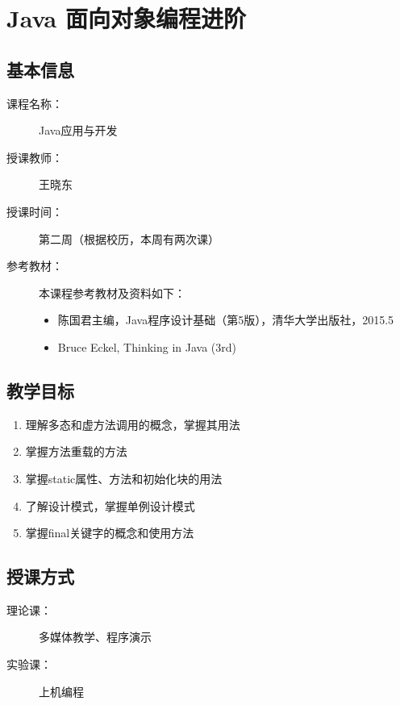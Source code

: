 \chapter{Java 面向对象编程进阶}
\label{chp:Advanced-object-oriented-programming-2}

\section*{基本信息}
\sline
\begin{description}
\item[课程名称：] Java应用与开发
\item[授课教师：] 王晓东
\item[授课时间：] 第二周（根据校历，本周有两次课）
\item[参考教材：] 本课程参考教材及资料如下：
  \begin{itemize}
  \item 陈国君主编，Java程序设计基础（第5版），清华大学出版社，2015.5
  \item Bruce Eckel, Thinking in Java (3rd)
  \end{itemize}
\end{description}

\section*{教学目标}

\sline

\begin{enumerate}
\item 理解多态和虚方法调用的概念，掌握其用法
\item 掌握方法重载的方法
\item 掌握static属性、方法和初始化块的用法
\item 了解设计模式，掌握单例设计模式
\item 掌握final关键字的概念和使用方法
\end{enumerate}  

\section*{授课方式}

\sline
\begin{description}
\item[理论课：] 多媒体教学、程序演示
\item[实验课：] 上机编程
\end{description}

\newpage
